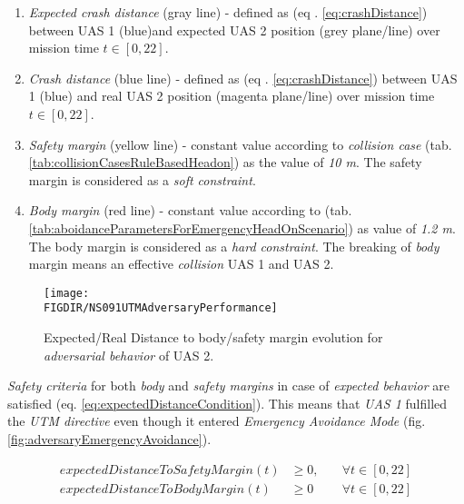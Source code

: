 \begin{enumerate}
    \item \emph{Expected crash distance} (gray line) - defined  as (eq . \ref{eq:crashDistance}) between UAS 1  (blue)and expected UAS 2 position (grey plane/line) over mission time $t\in[0,22]$.
    
    \item \emph{Crash distance} (blue line) - defined  as (eq . \ref{eq:crashDistance}) between UAS 1 (blue) and real UAS 2 position (magenta plane/line) over mission time $t\in[0,22]$.
    
    \item \emph{Safety margin} (yellow line) - constant value according to \emph{collision case}  (tab. \ref{tab:collisionCasesRuleBasedHeadon}) as the value of \emph{10 m}. The safety margin is considered as a \emph{soft constraint}.
    
    \item \emph{Body margin} (red line) - constant value according to (tab. \ref{tab:aboidanceParametersForEmergencyHeadOnScenario}) as value of  \emph{1.2 m}. The body margin is considered as a \emph{hard constraint}. The breaking of \emph{body} margin means an effective \emph{collision} UAS 1 and UAS 2.
\end{enumerate}

\begin{figure}[H]
    \centering
    \texttt{[image: \\FIGDIR/NS091UTMAdversaryPerformance]} 
    \caption{Expected/Real Distance to body/safety margin evolution for \emph{adversarial behavior} of UAS 2.}
    \label{fig:adversaryDistanceToSafetyMargins}
\end{figure}

\noindent\emph{Safety criteria} for both \emph{body} and \emph{safety margins} in case of \emph{expected behavior} are satisfied (eq. \ref{eq:expectedDistanceCondition}). This means that \emph{UAS 1} fulfilled the \emph{UTM directive} even though it entered \emph{Emergency Avoidance Mode} (fig. \ref{fig:adversaryEmergencyAvoidance}).

\begin{equation}\label{eq:expectedDistanceCondition}
    \begin{aligned}
    expectedDistanceToSafetyMargin(t) &\ge 0,\quad &\forall t \in [0,22]\\
    expectedDistanceToBodyMargin(t)  &\ge 0 \quad &\forall t \in [0,22]
    \end{aligned}
\end{equation}

